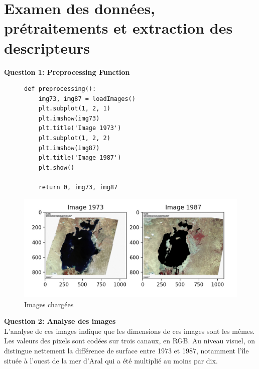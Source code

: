 \section{Examen des données, prétraitements et extraction des descripteurs}

\textbf{Question 1: Preprocessing Function}

\begin{figure}[!h]
    \begin{minipage}{.40\linewidth}
        \begin{verbatim}
def preprocessing():
    img73, img87 = loadImages()
    plt.subplot(1, 2, 1)
    plt.imshow(img73)
    plt.title('Image 1973')
    plt.subplot(1, 2, 2)
    plt.imshow(img87)
    plt.title('Image 1987')
    plt.show()

    return 0, img73, img87
            \end{verbatim}   
    \end{minipage}\hfill
    \begin{minipage}{.56\linewidth}
        \begin{center}
            \includegraphics[width=1.0\textwidth]{./img/2.1.jpg}
            \caption{\label{fig:1.2}Images chargées}  
        \end{center}
    \end{minipage}
\end{figure}


\textbf{Question 2: Analyse des images} \\

L'analyse de ces images indique que les dimensions de ces images sont les mêmes. Les valeurs des pixels sont codées sur trois
canaux, en RGB. Au niveau visuel, on distingue nettement la différence de surface entre 1973 et 1987, notamment l'île située 
à l'ouest de la mer d'Aral qui a été multiplié au moins par dix. 

